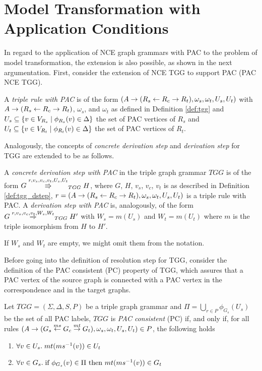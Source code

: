 \section{Model Transformation with Application Conditions}
In regard to the application of NCE graph grammars with PAC to the problem of model transformation, the extension is also possible, as shown in the next argumentation. First, consider the extension of NCE TGG to support PAC (PAC NCE TGG). 

\begin{definition}
	A \emph{triple rule with PAC} is of the form $(A \pro (R_s \ms{} R_c \mt{} R_t), \omega_s, \omega_t, U_s, U_t)$ with $A \pro (R_s \ms{} R_c \mt{} R_t)$, $\omega_s$, and $\omega_t$ as defined in Definition \ref{def:tgg} and $U_s \subseteq \{v \in V_{R_s} \st \phi_{R_s}(v) \in \Delta\}$ the set of PAC vertices of $R_s$ and $U_t \subseteq \{v \in V_{R_t} \st \phi_{R_t}(v) \in \Delta\}$ the set of PAC vertices of $R_t$.
\end{definition}

Analogously, the concepts of \textit{concrete derivation step} and \textit{derivation step} for TGG are extended to be as follows.

\begin{definition}
 A \textit{concrete derivation step with PAC} in the triple graph grammar $TGG$ is of the form $G \tcderivpac{r}{v_s,v_c,v_t}{U_s,U_t}{TGG} H$, where $G$, $H$, $v_s$, $v_c$, $v_t$ is as described in Definition \ref{def:tgg_dstep}, $r = (A \pro (R_s \ms{} R_c \mt{} R_t), \omega_s, \omega_t, U_s, U_t)$ is a triple rule with PAC. A \textit{derivation step with PAC} is, analogously, of the form $G \tderivpac{r}{v_s,v_c,v_t}{W_s,W_t}{TGG} H'$ with $W_s = m(U_s)$ and $W_t = m(U_t)$ where $m$ is the triple isomorphism from $H$ to $H'$.
\end{definition}

If $W_s$ and $W_t$ are empty, we might omit them from the notation.

Before going into the definition of resolution step for TGG, consider the definition of the PAC consistent (PC) property of TGG, which assures that a PAC vertex of the source graph is connected with a PAC vertex in the correspondence and in the target graphs.

\begin{definition}
	Let $TGG = (\Sigma, \Delta, S, P)$ be a triple graph grammar and $\Pi = \bigcup_{r \in P}{\phi_{G_s}(U_s)}$ be the set of all PAC labels, $TGG$ is \emph{PAC consistent} (PC) if, and only if, for all rules $(A \pro (G_s \ms{ms} G_c \mt{mt} G_t), \omega_s, \omega_t, U_s, U_t) \in P$, the following holds
	\begin{enumerate}
		\item $\forall v \in U_s \. mt(ms^{-1}(v)) \in U_t$
		\item $\forall v \in G_s \. \text{if } \phi_{G_s}(v) \in \Pi \text{ then } mt(ms^{-1}(v)) \in G_t$
	\end{enumerate}
\end{definition}

